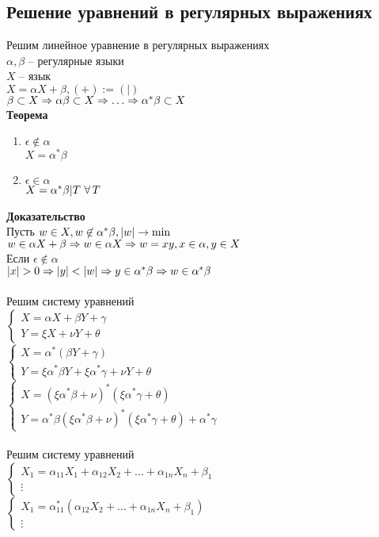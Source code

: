 \documentclass[12pt]{article}
\begin{document}
\subsection{Решение уравнений в регулярных выражениях}
Решим линейное уравнение в регулярных выражениях\\
$\alpha, \beta$ -- регулярные языки\\
$X$ -- язык\\
$X = \alpha X + \beta, (+) := (|)$\\
$\beta \subset X \Rightarrow \alpha\beta \subset X \Rightarrow \ldots \Rightarrow \alpha^*\beta \subset X$\\
\textbf{Теорема}
\begin{enumerate}
    \item $\epsilon \not\in \alpha$\\
    $X = \alpha^*\beta$
    \item $\epsilon \in \alpha$\\
    $X = \alpha^*\beta|T\ \forall\, T$
\end{enumerate}
\textbf{Доказательство}\\
Пусть $w \in X, w \not\in \alpha^*\beta, |w| \rightarrow \min$\\
$w \in \alpha X + \beta \Rightarrow w \in \alpha X \Rightarrow w=xy,x\in\alpha,y\in X$\\
Если $\epsilon \not\in \alpha$\\
$|x| > 0 \Rightarrow |y| < |w| \Rightarrow y \in \alpha^* \beta \Rightarrow w \in \alpha^*\beta$\\\\
Решим систему уравнений\\
$\left\{\begin{array}{ll}
    X = \alpha X + \beta Y + \gamma\\
    Y = \xi X + \nu Y + \theta
\end{array}\right.$\\
$\left\{\begin{array}{ll}
    X = \alpha^*(\beta Y + \gamma)\\
    Y = \xi \alpha^*\beta Y + \xi \alpha^* \gamma + \nu Y + \theta
\end{array}\right.$\\
$\left\{\begin{array}{ll}
    X = (\xi \alpha^*\beta + \nu)^*(\xi\alpha^*\gamma + \theta)\\
    Y = \alpha^*\beta(\xi \alpha^* \beta + \nu)^*(\xi\alpha^*\gamma + \theta) + \alpha^*\gamma
\end{array}\right.$\\\\
Решим систему уравнений\\
$\left\{\begin{array}{ll}
    X_1 = \alpha_{11}X_1 + \alpha_{12}X_2 + \ldots + \alpha_{1n}X_n + \beta_1\\
    \vdots
\end{array}\right.$\\
$\left\{\begin{array}{ll}
    X_1 = \alpha_{11}^*(\alpha_{12}X_2 + \ldots + \alpha_{1n}X_n + \beta_1)\\
    \vdots
\end{array}\right.$
\end{document}
